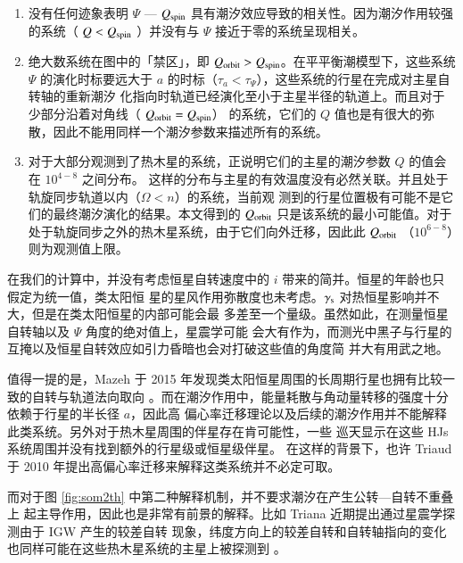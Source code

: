 \begin{enumerate}
\item 没有任何迹象表明 $\Psi$ --- $Q_\mathrm{spin}$ 具有潮汐效应导致的相关性。因为潮汐作用较强的系统（
$Q < Q_\mathrm{spin}$ ）并没有与 $\Psi$ 接近于零的系统呈现相关。
\item 绝大数系统在图中的「禁区」，即 $Q_\mathrm{orbit} > Q_\mathrm{spin}$。在平平衡潮模型下，这些系统 $\Psi$ 
的演化时标要远大于 $a$ 的时标（$\tau_a < \tau_\Psi$），这些系统的行星在完成对主星自转轴的重新潮汐
化指向时轨道已经演化至小于主星半径的轨道上。而且对于少部分沿着对角线（ $Q_\mathrm{orbit} = Q_\mathrm{spin}$）
的系统，它们的 $Q$ 值也是有很大的弥散，因此不能用同样一个潮汐参数来描述所有的系统。
\item 对于大部分观测到了热木星的系统，正说明它们的主星的潮汐参数 $Q$ 的值会在 $10^{4-8}$ 之间分布。
这样的分布与主星的有效温度没有必然关联。并且处于轨旋同步轨道以内（$\Omega < n$）的系统，当前观
测到的行星位置极有可能不是它们的最终潮汐演化的结果\cite{Schlaufman2010}。本文得到的 $Q_\mathrm{orbit}$
只是该系统的最小可能值。对于处于轨旋同步之外的热木星系统，由于它们向外迁移，因此此 $Q_\mathrm{orbit}$
（$10^{6-8}$）则为观测值上限。
\end{enumerate}


在我们的计算中，并没有考虑恒星自转速度中的 $i$ 带来的简并。恒星的年龄也只假定为统一值，类太阳恒
星的星风作用弥散度也未考虑。$\gamma_\mathrm{s}$ 对热恒星影响并不大，但是在类太阳恒星的内部可能会最
多差至一个量级。虽然如此，在测量恒星自转轴\cite{Hirano2012}以及 $\Psi$ 角度的绝对值上，星震学可能
会大有作为\cite{Chaplin2013,Benomar2014}，而测光中黑子与行星的互掩\cite{Desert2011,Nutzman2011,
SanchisOjeda2011}以及恒星自转效应如引力昏暗\cite{Barnes2011,Szabo2011}也会对打破这些值的角度简
并大有用武之地。

值得一提的是，Mazeh 于 2015 年发现类太阳恒星周围的长周期行星也拥有比较一致的自转与轨道法向取向
\cite{Mazeh2015}。而在潮汐作用中，能量耗散与角动量转移的强度十分依赖于行星的半长径 $a$，因此高
偏心率迁移理论以及后续的潮汐作用并不能解释此类系统。另外对于热木星周围的伴星存在肯可能性，一些
巡天显示在这些 HJs 系统周围并没有找到额外的行星级或恒星级伴星\cite{Schlaufman2016,Knutson2014}。
在这样的背景下，也许 Triaud 于 2010 年提出高偏心率迁移来解释这类系统并不必定可取\cite{Triaud2010}。

而对于图 \ref{fig:som2th} 中第二种解释机制\cite{Rogers2012}，并不要求潮汐在产生公转---自转不重叠上
起主导作用，因此也是非常有前景的解释。比如 Triana 近期提出通过星震学探测由于 IGW 产生的较差自转
现象，纬度方向上的较差自转和自转轴指向的变化也同样可能在这些热木星系统的主星上被探测到
\cite{Triana2015}。



